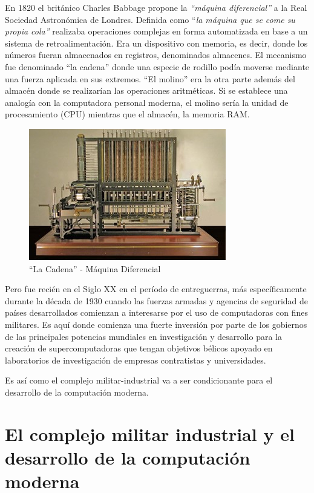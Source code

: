 \documentclass[
  letterpaper,
  DIV=11,
  numbers=noendperiod]{scrreprt}
\begin{document}
En 1820 el británico Charles Babbage propone la \emph{``máquina
diferencial''} a la Real Sociedad Astronómica de Londres. Definida como
``\emph{la máquina que se come su propia cola''} realizaba operaciones
complejas en forma automatizada en base a un sistema de
retroalimentación. Era un dispositivo con memoria, es decir, donde los
números fueran almacenados en registros, denominados almacenes. El
mecanismo fue denominado ``la cadena'' donde una especie de rodillo
podía moverse mediante una fuerza aplicada en sus extremos. ``El
molino'' era la otra parte además del almacén donde se realizarían las
operaciones aritméticas. Si se establece una analogía con la computadora
personal moderna, el molino sería la unidad de procesamiento (CPU)
mientras que el almacén, la memoria RAM.

\begin{figure}[H]

{\centering \includegraphics{images_2_cap/3-la-cadena-memoria-ram.jpg}

}

\caption{``La Cadena'' - Máquina Diferencial}

\end{figure}%

Pero fue recién en el Siglo XX en el período de entreguerras, más
específicamente durante la década de 1930 cuando las fuerzas armadas y
agencias de seguridad de países desarrollados comienzan a interesarse
por el uso de computadoras con fines militares. Es aquí donde comienza
una fuerte inversión por parte de los gobiernos de las principales
potencias mundiales en investigación y desarrollo para la creación de
supercomputadoras que tengan objetivos bélicos apoyado en laboratorios
de investigación de empresas contratistas y universidades.

Es así como el complejo militar-industrial va a ser condicionante para
el desarrollo de la computación moderna.

\section{\texorpdfstring{\textbf{El complejo militar industrial y el
desarrollo de la computación
moderna}}{El complejo militar industrial y el desarrollo de la computación moderna}}\label{el-complejo-militar-industrial-y-el-desarrollo-de-la-computaciuxf3n-moderna}
\end{document}
